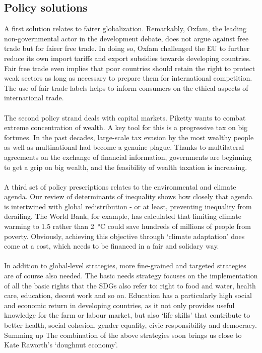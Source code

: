 \documentclass[../summary.tex]{subfiles}
\begin{document}
	\subsection{Policy solutions}
	
	A first solution relates to fairer globalization. Remarkably, Oxfam, the leading non-governmental actor in the development debate, does not argue against free trade but for fairer free trade. In doing so, Oxfam challenged the EU to further reduce its own import tariffs and export subsidies towards developing countries. Fair free trade even implies that poor countries should retain the right to protect weak sectors as long as necessary to prepare them for international competition. The use of fair trade labels helps to inform consumers on the ethical aspects of international trade. 
	\\\\
	The second policy strand deals with capital markets. Piketty wants to combat extreme concentration of wealth. A key tool for this is a progressive tax on big fortunes. In the past decades, large-scale tax evasion by the most wealthy people as well as multinational had become a genuine plague. Thanks to multilateral agreements on the exchange of financial information, governments are beginning to get a grip on big wealth, and the feasibility of wealth taxation is increasing.
	\\\\
	A third set of policy prescriptions relates to the environmental and climate agenda. Our review of determinants of inequality shows how closely that agenda is intertwined with global redistribution - or at least, preventing inequality from derailing. The World Bank, for example, has calculated that limiting climate warming to 1.5 rather than \SI{2}{\degreeCelsius} could save hundreds of millions of people from poverty. Obviously, achieving this objective through `climate adaptation' does come at a cost, which needs to be financed in a fair and solidary way.
	\\\\
	In addition to global-level strategies, more fine-grained and targeted strategies are of course also needed. The basic needs strategy focuses on the implementation of all the basic rights that the SDGs also refer to: right to food and water, health care, education, decent work and so on. Education has a particularly high social and economic return in developing countries, as it not only provides useful knowledge for the farm or labour market, but also `life skills' that contribute to better health, social cohesion, gender equality, civic responsibility and democracy. Summing up The combination of the above strategies soon brings us close to Kate Raworth's `doughnut economy'.
	
\end{document}
